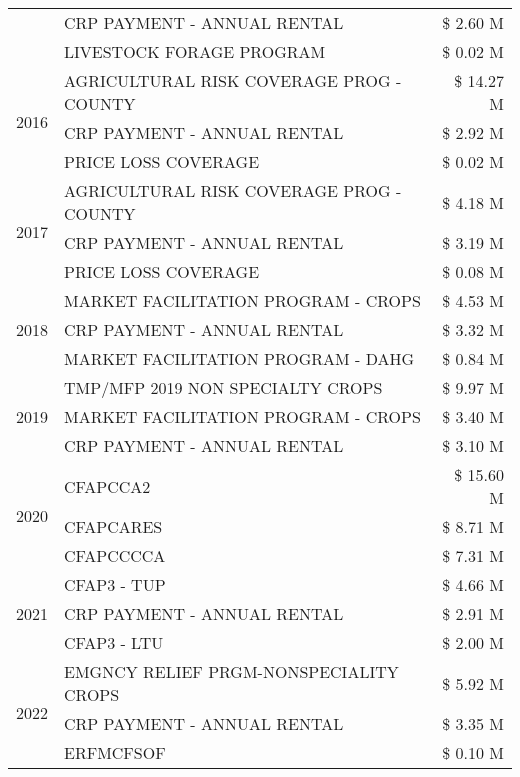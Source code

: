 \begin{tabular}{llr}
 & CRP PAYMENT - ANNUAL RENTAL & \$ 2.60 M \\
 & LIVESTOCK FORAGE PROGRAM & \$ 0.02 M \\
\cline{1-3}
\multirow[t]{3}{*}{2016} & AGRICULTURAL RISK COVERAGE PROG - COUNTY & \$ 14.27 M \\
 & CRP PAYMENT - ANNUAL RENTAL & \$ 2.92 M \\
 & PRICE LOSS COVERAGE & \$ 0.02 M \\
\cline{1-3}
\multirow[t]{3}{*}{2017} & AGRICULTURAL RISK COVERAGE PROG - COUNTY & \$ 4.18 M \\
 & CRP PAYMENT - ANNUAL RENTAL & \$ 3.19 M \\
 & PRICE LOSS COVERAGE & \$ 0.08 M \\
\cline{1-3}
\multirow[t]{3}{*}{2018} & MARKET FACILITATION PROGRAM - CROPS & \$ 4.53 M \\
 & CRP PAYMENT - ANNUAL RENTAL & \$ 3.32 M \\
 & MARKET FACILITATION PROGRAM - DAHG & \$ 0.84 M \\
\cline{1-3}
\multirow[t]{3}{*}{2019} & TMP/MFP 2019 NON SPECIALTY CROPS & \$ 9.97 M \\
 & MARKET FACILITATION PROGRAM - CROPS & \$ 3.40 M \\
 & CRP PAYMENT - ANNUAL RENTAL & \$ 3.10 M \\
\cline{1-3}
\multirow[t]{3}{*}{2020} & CFAPCCA2 & \$ 15.60 M \\
 & CFAPCARES & \$ 8.71 M \\
 & CFAPCCCCA & \$ 7.31 M \\
\cline{1-3}
\multirow[t]{3}{*}{2021} & CFAP3 - TUP & \$ 4.66 M \\
 & CRP PAYMENT - ANNUAL RENTAL & \$ 2.91 M \\
 & CFAP3 - LTU & \$ 2.00 M \\
\cline{1-3}
\multirow[t]{3}{*}{2022} & EMGNCY RELIEF PRGM-NONSPECIALITY CROPS & \$ 5.92 M \\
 & CRP PAYMENT - ANNUAL RENTAL & \$ 3.35 M \\
 & ERFMCFSOF & \$ 0.10 M \\
\cline{1-3}
\bottomrule
\end{tabular}
